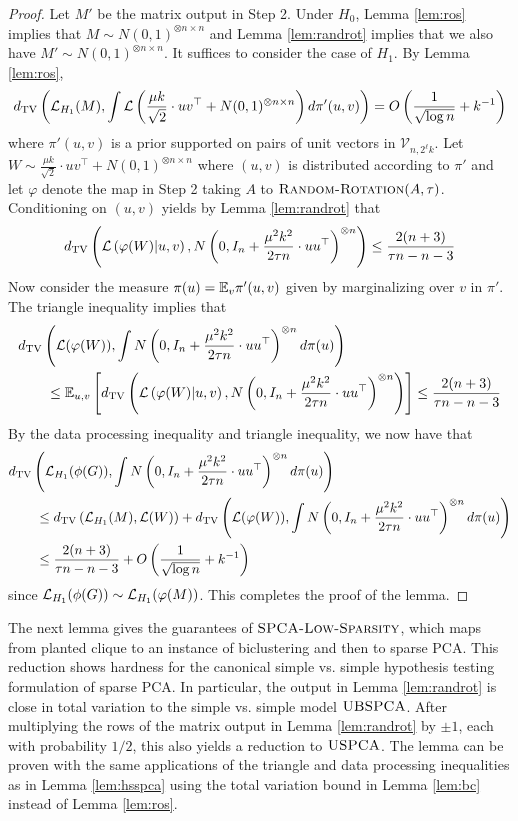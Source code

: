 \begin{proof}
Let $M'$ be the matrix output in Step 2. Under $H_0$, Lemma \ref{lem:ros} implies that $M \sim N(0, 1)^{\otimes n \times n}$ and Lemma \ref{lem:randrot} implies that we also have $M' \sim N(0, 1)^{\otimes n \times n}$. It suffices to consider the case of $H_1$. By Lemma \ref{lem:ros}, 
$$d_{\text{TV}}\left( \mathcal{L}_{H_1}(M), \int \mathcal{L}\left( \frac{\mu k}{\sqrt{2}} \cdot  uv^\top + N(0, 1)^{\otimes n \times n} \right) d\pi'(u, v) \right) = O\left( \frac{1}{\sqrt{\log n}} + k^{-1} \right)$$
where $\pi'(u, v)$ is a prior supported on pairs of unit vectors in $\mathcal{V}_{n, 2^\ell k}$. Let $W \sim \frac{\mu k}{\sqrt{2}} \cdot  uv^\top + N(0, 1)^{\otimes n \times n}$ where $(u, v)$ is distributed according to $\pi'$ and let $\varphi$ denote the map in Step 2 taking $A$ to $\textsc{Random-Rotation}(A, \tau)$. Conditioning on $(u, v)$ yields by Lemma \ref{lem:randrot} that
$$d_{\text{TV}}\left( \mathcal{L}\left( \varphi(W) | u, v \right), N\left(0, I_n + \frac{\mu^2 k^2}{2 \tau n} \cdot uu^\top\right)^{\otimes n} \right) \le \frac{2(n + 3)}{\tau n - n - 3}$$
Now consider the measure $\pi(u) = \mathbb{E}_{v} \pi'(u, v)$ given by marginalizing over $v$ in $\pi'$. The triangle inequality implies that
\begin{align*}
&d_{\text{TV}}\left( \mathcal{L}(\varphi(W)), \int N\left(0, I_n + \frac{\mu^2 k^2}{2 \tau n} \cdot uu^\top\right)^{\otimes n} d\pi(u) \right) \\
&\quad \quad \le \mathbb{E}_{u, v} \left[ d_{\text{TV}}\left( \mathcal{L}\left( \varphi(W) | u, v \right), N\left(0, I_n + \frac{\mu^2 k^2}{2 \tau n} \cdot uu^\top\right)^{\otimes n} \right) \right] \le \frac{2(n + 3)}{\tau n - n - 3}
\end{align*}
By the data processing inequality and triangle inequality, we now have that
\begin{align*}
&d_{\text{TV}}\left( \mathcal{L}_{H_1}(\phi(G)), \int N\left(0, I_n + \frac{\mu^2 k^2}{2 \tau n} \cdot uu^\top\right)^{\otimes n} d\pi(u) \right) \\
&\quad \quad \le d_{\text{TV}}\left( \mathcal{L}_{H_1}(M), \mathcal{L}(W) \right) + d_{\text{TV}}\left( \mathcal{L}(\varphi(W)), \int N\left(0, I_n + \frac{\mu^2 k^2}{2 \tau n} \cdot uu^\top\right)^{\otimes n} d\pi(u) \right) \\
&\quad \quad \le \frac{2(n + 3)}{\tau n - n - 3} + O\left( \frac{1}{\sqrt{\log n}} + k^{-1} \right)
\end{align*}
since $\mathcal{L}_{H_1}(\phi(G)) \sim \mathcal{L}_{H_1}(\varphi(M))$. This completes the proof of the lemma.
\end{proof}

The next lemma gives the guarantees of $\textsc{SPCA-Low-Sparsity}$, which maps from planted clique to an instance of biclustering and then to sparse PCA. This reduction shows hardness for the canonical simple vs. simple hypothesis testing formulation of sparse PCA. In particular, the output in Lemma \ref{lem:randrot} is close in total variation to the simple vs. simple model $\textsc{UBSPCA}$. After multiplying the rows of the matrix output in Lemma \ref{lem:randrot} by $\pm 1$, each with probability $1/2$, this also yields a reduction to $\textsc{USPCA}$. The lemma can be proven with the same applications of the triangle and data processing inequalities as in Lemma \ref{lem:hsspca} using the total variation bound in Lemma \ref{lem:bc} instead of Lemma \ref{lem:ros}. 

